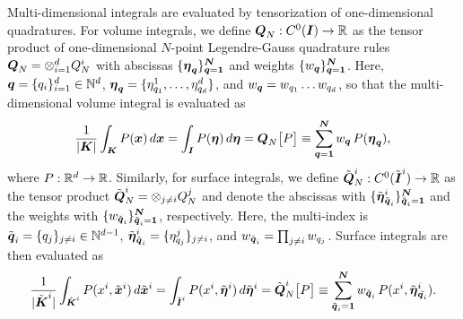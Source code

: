 \documentclass[10pt,preprint]{aastex}
\begin{document}
Multi-dimensional integrals are evaluated by tensorization of one-dimensional quadratures.  
For volume integrals, we define $\boldsymbol{Q}_{N}:C^{0}(\boldsymbol{I})\to\mathbb{R}$ as the tensor product of one-dimensional $N$-point Legendre-Gauss quadrature rules $\boldsymbol{Q}_{N}=\otimes_{i=1}^{d}Q_{N}^{i}$ with abscissas $\{\boldsymbol{\eta}_{\boldsymbol{q}}\}_{\boldsymbol{q}=\boldsymbol{1}}^{\boldsymbol{N}}$ and weights $\{w_{\boldsymbol{q}}\}_{\boldsymbol{q}=\boldsymbol{1}}^{\boldsymbol{N}}$.  
Here, $\boldsymbol{q}=\{q_{i}\}_{i=1}^{d}\in\mathbb{N}^{d}$, $\boldsymbol{\eta}_{\boldsymbol{q}}=\{\eta_{q_{1}}^{1},\ldots,\eta_{q_{d}}^{d}\}$, and $w_{\boldsymbol{q}}=w_{q_{1}}\ldots w_{q_{d}}$, so that the multi-dimensional volume integral is evaluated as
\begin{equation}
  \frac{1}{|\boldsymbol{K}|}\int_{\boldsymbol{K}}P(\boldsymbol{x})\,d\boldsymbol{x}
  =\int_{\boldsymbol{I}}P(\boldsymbol{\eta})\,d\boldsymbol{\eta}
  =\boldsymbol{Q}_{N}\big[P\big]
  \equiv\sum_{\boldsymbol{q}=\boldsymbol{1}}^{\boldsymbol{N}}w_{\boldsymbol{q}}\,P(\boldsymbol{\eta}_{\boldsymbol{q}}),
\end{equation}
where $P:\mathbb{R}^{d}\to\mathbb{R}$.  
Similarly, for surface integrals, we define $\tilde{\boldsymbol{Q}}_{N}^{i}:C^{0}(\tilde{\boldsymbol{I}}^{i})\to\mathbb{R}$ as the tensor product $\tilde{\boldsymbol{Q}}_{N}^{i}=\otimes_{j\ne i}Q_{N}^{j}$ and denote the abscissas with $\{\tilde{\boldsymbol{\eta}}_{\tilde{\boldsymbol{q}}_{i}}^{i}\}_{\tilde{\boldsymbol{q}}_{i}=\boldsymbol{1}}^{\boldsymbol{N}}$ and the weights with $\{w_{\tilde{\boldsymbol{q}}_{i}}\}_{\tilde{\boldsymbol{q}}_{i}=\boldsymbol{1}}^{\boldsymbol{N}}$, respectively.  
Here, the multi-index is $\tilde{\boldsymbol{q}}_{i}=\{q_{j}\}_{j\ne i}\in\mathbb{N}^{d-1}$, $\tilde{\boldsymbol{\eta}}_{\tilde{\boldsymbol{q}}_{i}}^{i}=\{\eta_{q_{j}}^{j}\}_{j\ne i}$, and $w_{\tilde{\boldsymbol{q}}_{i}}=\prod_{j\ne i}w_{q_{j}}$.  
Surface integrals are then evaluated as
\begin{equation}
  \frac{1}{|\tilde{\boldsymbol{K}}^{i}|}\int_{\tilde{\boldsymbol{K}}^{i}}P(x^{i},\tilde{\boldsymbol{x}}^{i})\,d\tilde{\boldsymbol{x}}^{i}
  =\int_{\tilde{\boldsymbol{I}}^{i}}P(x^{i},\tilde{\boldsymbol{\eta}}^{i})\,d\tilde{\boldsymbol{\eta}}^{i}
  =\tilde{\boldsymbol{Q}}_{N}^{i}\big[P\big]
  \equiv\sum_{\tilde{\boldsymbol{q}}_{i}=\boldsymbol{1}}^{\boldsymbol{N}}w_{\tilde{\boldsymbol{q}}_{i}}\,P(x^{i},\tilde{\boldsymbol{\eta}}_{\tilde{\boldsymbol{q}_{i}}}^{i}).  
\end{equation}
\end{document}
